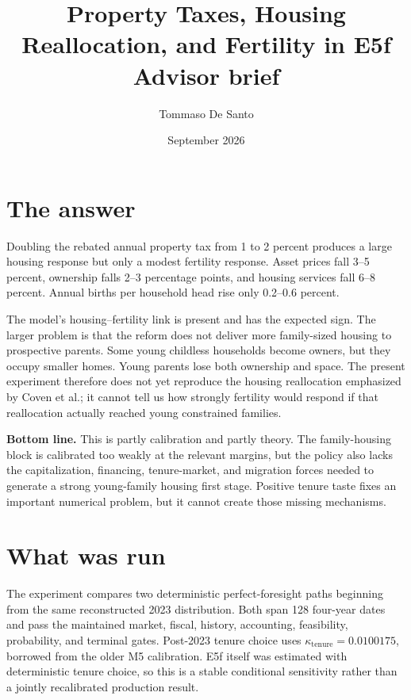 \documentclass[10pt]{article}
\title{\vspace{-2.4em}\textbf{Property Taxes, Housing Reallocation, and Fertility in E5f}\\[-0.05em]
\large Advisor brief}
\author{Tommaso De Santo}
\date{September 2026}
\begin{document}
\maketitle
\vspace{-1.7em}

\section*{The answer}

Doubling the rebated annual property tax from 1 to 2 percent produces a large housing response but only a modest fertility response. Asset prices fall 3--5 percent, ownership falls 2--3 percentage points, and housing services fall 6--8 percent. Annual births per household head rise only 0.2--0.6 percent.

The model's housing--fertility link is present and has the expected sign. The larger problem is that the reform does not deliver more family-sized housing to prospective parents. Some young childless households become owners, but they occupy smaller homes. Young parents lose both ownership and space. The present experiment therefore does not yet reproduce the housing reallocation emphasized by Coven et al.; it cannot tell us how strongly fertility would respond if that reallocation actually reached young constrained families.

\begin{center}
\colorbox{accent!9}{\parbox{0.95\textwidth}{
\textbf{Bottom line.} This is partly calibration and partly theory. The family-housing block is calibrated too weakly at the relevant margins, but the policy also lacks the capitalization, financing, tenure-market, and migration forces needed to generate a strong young-family housing first stage. Positive tenure taste fixes an important numerical problem, but it cannot create those missing mechanisms.
}}
\end{center}

\section*{What was run}

The experiment compares two deterministic perfect-foresight paths beginning from the same reconstructed 2023 distribution. Both span 128 four-year dates and pass the maintained market, fiscal, history, accounting, feasibility, probability, and terminal gates. Post-2023 tenure choice uses $\kappa_{\mathrm{tenure}}=0.0100175$, borrowed from the older M5 calibration. E5f itself was estimated with deterministic tenure choice, so this is a stable conditional sensitivity rather than a jointly recalibrated production result.
\end{document}
